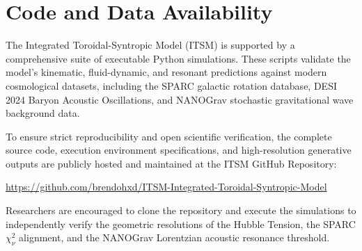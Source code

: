 \documentclass[aps,prd,10pt,onecolumn,superscriptaddress,nofootinbib]{revtex4-2}
\begin{document}
\section*{Code and Data Availability}
The Integrated Toroidal-Syntropic Model (ITSM) is supported by a comprehensive suite of executable Python simulations. These scripts validate the model's kinematic, fluid-dynamic, and resonant predictions against modern cosmological datasets, including the SPARC galactic rotation database, DESI 2024 Baryon Acoustic Oscillations, and NANOGrav stochastic gravitational wave background data.

To ensure strict reproducibility and open scientific verification, the complete source code, execution environment specifications, and high-resolution generative outputs are publicly hosted and maintained at the ITSM GitHub Repository:

\begin{center}
\url{https://github.com/brendohxd/ITSM-Integrated-Toroidal-Syntropic-Model}
\end{center}

Researchers are encouraged to clone the repository and execute the simulations to independently verify the geometric resolutions of the Hubble Tension, the SPARC $\chi^2_\nu$ alignment, and the NANOGrav Lorentzian acoustic resonance threshold.

\clearpage
\end{document}
